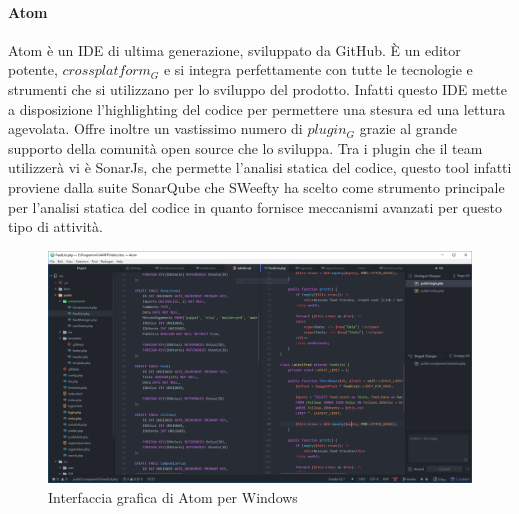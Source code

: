 	
	\paragraph{Atom}
	\label{sec:Atom}
	\Spazio	
	Atom è un IDE di ultima generazione, sviluppato da GitHub. È un editor potente,
	$crossplatform_G$ e si integra perfettamente con tutte le tecnologie e strumenti che si utilizzano per lo sviluppo del prodotto. Infatti questo IDE mette a disposizione l'highlighting del codice per permettere una stesura ed una lettura agevolata. 
	Offre inoltre un vastissimo numero di $plugin_G$ grazie al grande supporto della comunità open source che lo sviluppa. Tra i plugin che il team utilizzerà vi è SonarJs, che permette l'analisi statica del codice, questo tool infatti proviene dalla suite SonarQube che SWeefty ha scelto come strumento principale per l'analisi statica del codice in quanto fornisce meccanismi avanzati per questo tipo di attività.
	
	\begin{figure}[H]
		\label{Atom}
		\centering 
		\includegraphics[width=1\textwidth]{images/atom.png}
		\caption{Interfaccia grafica di Atom per Windows} %
	\end{figure}
	
			
